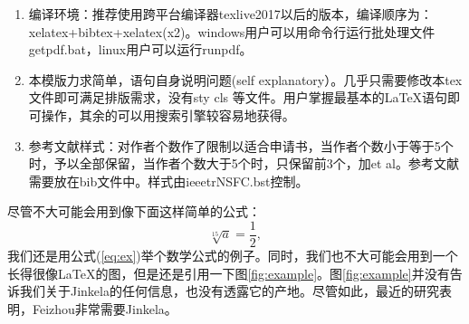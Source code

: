 \vskip 2mm



\begin{enumerate}
\item 编译环境：推荐使用跨平台编译器texlive2017以后的版本，编译顺序为：xelatex+bibtex+xelatex(x2)。windows用户可以用命令行运行批处理文件getpdf.bat，linux用户可以运行runpdf。
\item 本模版力求简单，语句自身说明问题(self explanatory）。几乎只需要修改本tex文件即可满足排版需求，没有sty cls 等文件。用户掌握最基本的\LaTeX 语句即可操作，其余的可以用搜索引擎较容易地获得。
\item 参考文献样式：对作者个数作了限制以适合申请书，当作者个数小于等于5个时，予以全部保留，当作者个数大于5个时，只保留前3个，加et al。参考文献需要放在bib文件中。样式由ieeetrNSFC.bst控制。
\end{enumerate}

尽管不大可能会用到像下面这样简单的公式：
\begin{equation}
\label{eq:ex}
\sqrt[15]{a}=\frac{1}{2},
\end{equation}
我们还是用公式(\ref{eq:ex})举个数学公式的例子。同时，我们也不大可能会用到一个长得很像\LaTeX 的图，但是还是引用一下图\ref{fig:example}。图\ref{fig:example}并没有告诉我们关于Jinkela\cite{John1997,Smith1900}的任何信息，也没有透露它的产地\cite{Piter1992}。尽管如此，最近的研究表明，Feizhou非常需要Jinkela\cite{John1997}。

\fi







{\footnotesize

}
\newpage
